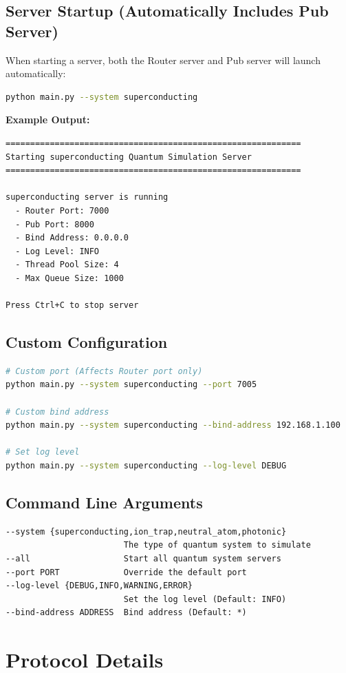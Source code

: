 \documentclass[UTF8, a4paper, 12pt]{article}
\begin{document}
\subsection{Server Startup (Automatically Includes Pub Server)}
When starting a server, both the Router server and Pub server will launch automatically:
\begin{lstlisting}[language=bash]
python main.py --system superconducting
\end{lstlisting}

\textbf{Example Output:}
\begin{lstlisting}
============================================================
Starting superconducting Quantum Simulation Server
============================================================

superconducting server is running
  - Router Port: 7000
  - Pub Port: 8000
  - Bind Address: 0.0.0.0
  - Log Level: INFO
  - Thread Pool Size: 4
  - Max Queue Size: 1000

Press Ctrl+C to stop server
\end{lstlisting}

\subsection{Custom Configuration}
\begin{lstlisting}[language=bash]
# Custom port (Affects Router port only)
python main.py --system superconducting --port 7005

# Custom bind address
python main.py --system superconducting --bind-address 192.168.1.100

# Set log level
python main.py --system superconducting --log-level DEBUG
\end{lstlisting}

\subsection{Command Line Arguments}
\begin{lstlisting}
--system {superconducting,ion_trap,neutral_atom,photonic}
                        The type of quantum system to simulate
--all                   Start all quantum system servers
--port PORT             Override the default port
--log-level {DEBUG,INFO,WARNING,ERROR}
                        Set the log level (Default: INFO)
--bind-address ADDRESS  Bind address (Default: *)
\end{lstlisting}

\section{Protocol Details}
\end{document}
